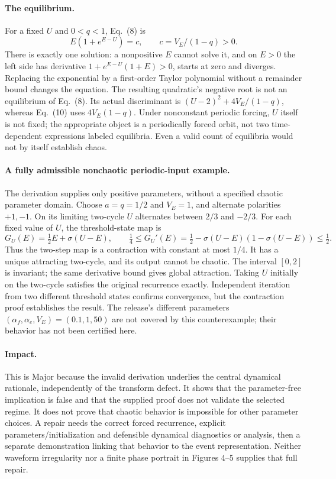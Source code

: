 \documentclass[10pt]{article}
\begin{document}
\paragraph*{The equilibrium.}\mbox{}\par
For a fixed \(U\) and \(0<q<1\), Eq. (8) is \[E(1+e^{E-U})=c,\qquad c=V_E/(1-q)>0.\] There is exactly one solution: a nonpositive \(E\) cannot solve it, and on \(E>0\) the left side has derivative \(1+e^{E-U}(1+E)>0\), starts at zero and diverges. Replacing the exponential by a first-order Taylor polynomial without a remainder bound changes the equation. The resulting quadratic’s negative root is not an equilibrium of Eq. (8). Its actual discriminant is \((U-2)^2+4V_E/(1-q)\), whereas Eq. (10) uses \(4V_E(1-q)\). Under nonconstant periodic forcing, \(U\) itself is not fixed; the appropriate object is a periodically forced orbit, not two time-dependent expressions labeled equilibria. Even a valid count of equilibria would not by itself establish chaos.\par
\paragraph*{A fully admissible nonchaotic periodic-input example.}\mbox{}\par
The derivation supplies only positive parameters, without a specified chaotic parameter domain. Choose \(a=q=1/2\) and \(V_E=1\), and alternate polarities \(+1,-1\). On its limiting two-cycle \(U\) alternates between \(2/3\) and \(-2/3\). For each fixed value of \(U\), the threshold-state map is \[G_U(E)=\tfrac12E+\sigma(U-E),\qquad
 \tfrac14\le G_U'(E)=\tfrac12-\sigma(U-E)(1-\sigma(U-E))\le\tfrac12.\] Thus the two-step map is a contraction with constant at most \(1/4\). It has a unique attracting two-cycle, and its output cannot be chaotic. The interval \([0,2]\) is invariant; the same derivative bound gives global attraction. Taking \(U\) initially on the two-cycle satisfies the original recurrence exactly. Independent iteration from two different threshold states confirms convergence, but the contraction proof establishes the result. The release’s different parameters \((\alpha_f,\alpha_e,V_E)=(0.1,1,50)\) are not covered by this counterexample; their behavior has not been certified here.\par
\paragraph*{Impact.}\mbox{}\par
This is Major because the invalid derivation underlies the central dynamical rationale, independently of the transform defect. It shows that the parameter-free implication is false and that the supplied proof does not validate the selected regime. It does not prove that chaotic behavior is impossible for other parameter choices. A repair needs the correct forced recurrence, explicit parameters/initialization and defensible dynamical diagnostics or analysis, then a separate demonstration linking that behavior to the event representation. Neither waveform irregularity nor a finite phase portrait in Figures 4–5 supplies that full repair.\par
\end{document}
